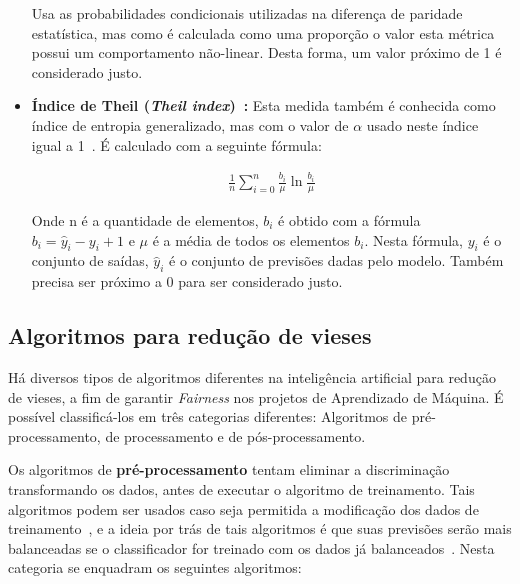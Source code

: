 \documentclass[portugues]{ic-tese}
\begin{document}
\begin{itemize}
Usa as probabilidades condicionais utilizadas na diferença de paridade estatística, mas como é calculada como uma proporção o valor esta métrica possui um comportamento não-linear. Desta forma, um valor próximo de 1 é considerado justo.

\item \textbf{Índice de Theil (\textit{Theil index})~\citep{Speicher_2018}:} Esta medida também é conhecida como índice de entropia generalizado, mas com o valor de $\alpha$ usado neste índice igual a 1~\citep{Speicher_2018}. É calculado com a seguinte fórmula:

\begin{align*}
\frac{1}{n}\sum^{n}_{i=0}\frac{b_i}{\mu}\ln{\frac{b_i}{\mu}}
\end{align*}

Onde n é a quantidade de elementos, $b_i$ é obtido com a fórmula $b_i = \hat{y}_i - y_i + 1$ e $\mu$ é a média de todos os elementos $b_i$. Nesta fórmula, $y_i$ é o conjunto de saídas, $\hat{y}_i$ é o conjunto de previsões dadas pelo modelo. Também precisa ser próximo a 0 para ser considerado justo.

\end{itemize}

\subsection{Algoritmos para redução de vieses}
\label{sec:FairnessAlgorithms}

Há diversos tipos de algoritmos diferentes na inteligência artificial para redução de vieses, a fim de garantir \textit{Fairness} nos projetos de Aprendizado de Máquina. É possível classificá-los em três categorias diferentes: Algoritmos de pré-processamento, de processamento e de pós-processamento.

Os algoritmos de \textbf{pré-processamento} tentam eliminar a discriminação transformando os dados, antes de executar o algoritmo de treinamento. Tais algoritmos podem ser usados caso seja permitida a modificação dos dados de treinamento~\citep{dAlessandro_2017}, e a ideia por trás de tais algoritmos é que suas previsões serão mais balanceadas se o classificador for treinado com os dados já balanceados~\citep{Kamiran_2009}. Nesta categoria se enquadram os seguintes algoritmos:
\end{document}
